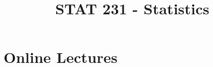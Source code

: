 
\title{STAT 231 - Statistics}



\maketitle
\tableofcontents
\newpage
























\chapter{Online Lectures}





